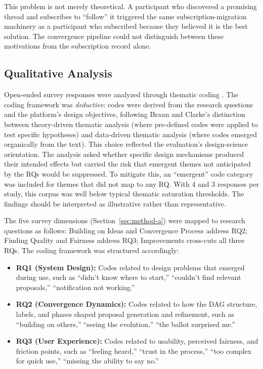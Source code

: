 \documentclass[a4paper, 12pt, twoside]{iviathesis}
\begin{document}
This problem is not merely theoretical. A participant who discovered a promising thread and subscribes to ``follow'' it triggered the same subscription-migration machinery as a participant who subscribed because they believed it is the best solution. The convergence pipeline could not distinguish between these motivations from the subscription record alone.

\subsection{Qualitative Analysis}
\label{sec:qual-analysis}
Open-ended survey responses were analyzed through thematic coding \cite{braun2006using}. The coding framework was \textit{deductive}: codes were derived from the research questions and the platform's design objectives, following Braun and Clarke's \cite{braun2006using} distinction between theory-driven thematic analysis (where pre-defined codes were applied to test specific hypotheses) and data-driven thematic analysis (where codes emerged organically from the text). This choice reflected the evaluation's design-science orientation. The analysis asked whether specific design mechanisms produced their intended effects but carried the risk that emergent themes not anticipated by the RQs would be suppressed. To mitigate this, an ``emergent'' code category was included for themes that did not map to any RQ. With 4 and 3 responses per study, this corpus was well below typical thematic saturation thresholds. The findings should be interpreted as illustrative rather than representative.

The five survey dimensions (Section~\ref{sec:method-a}) were mapped to research questions as follows: Building on Ideas and Convergence Process address RQ2; Finding Quality and Fairness address RQ3; Improvements cross-cuts all three RQs. The coding framework was structured accordingly:
\begin{itemize}
    \item \textbf{RQ1 (System Design):} Codes related to design problems that emerged during use, such as ``didn't know where to start,'' ``couldn't find relevant proposals,'' ``notification not working.''
    \item \textbf{RQ2 (Convergence Dynamics):} Codes related to how the DAG structure, labels, and phases shaped proposal generation and refinement, such as ``building on others,'' ``seeing the evolution,'' ``the ballot surprised me.''
    \item \textbf{RQ3 (User Experience):} Codes related to usability, perceived fairness, and friction points, such as ``feeling heard,'' ``trust in the process,'' ``too complex for quick use,'' ``missing the ability to say no.''

\end{itemize}
\end{document}
